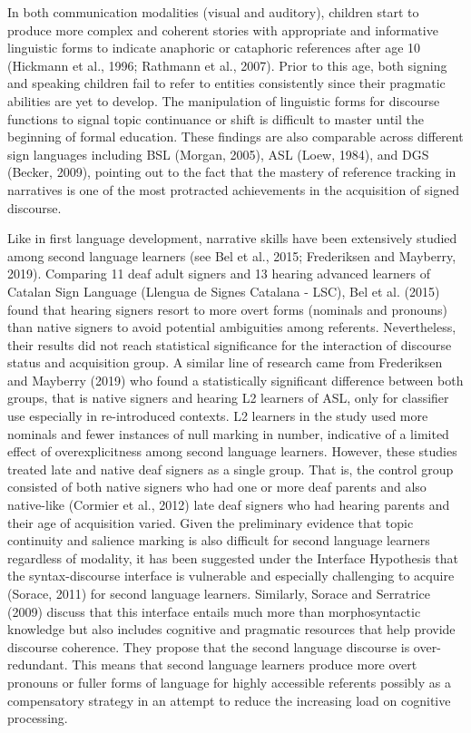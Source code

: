 \documentclass[]{elsarticle} %
\begin{document}
In both communication modalities (visual and auditory), children start
to produce more complex and coherent stories with appropriate and
informative linguistic forms to indicate anaphoric or cataphoric
references after age 10 (Hickmann et al., 1996; Rathmann et al., 2007).
Prior to this age, both signing and speaking children fail to refer to
entities consistently since their pragmatic abilities are yet to
develop. The manipulation of linguistic forms for discourse functions to
signal topic continuance or shift is difficult to master until the
beginning of formal education. These findings are also comparable across
different sign languages including BSL (Morgan, 2005), ASL (Loew, 1984),
and DGS (Becker, 2009), pointing out to the fact that the mastery of
reference tracking in narratives is one of the most protracted
achievements in the acquisition of signed discourse.

Like in first language development, narrative skills have been
extensively studied among second language learners (see Bel et al.,
2015; Frederiksen and Mayberry, 2019). Comparing 11 deaf adult signers
and 13 hearing advanced learners of Catalan Sign Language (Llengua de
Signes Catalana - LSC), Bel et al. (2015) found that hearing signers
resort to more overt forms (nominals and pronouns) than native signers
to avoid potential ambiguities among referents. Nevertheless, their
results did not reach statistical significance for the interaction of
discourse status and acquisition group. A similar line of research came
from Frederiksen and Mayberry (2019) who found a statistically
significant difference between both groups, that is native signers and
hearing L2 learners of ASL, only for classifier use especially in
re-introduced contexts. L2 learners in the study used more nominals and
fewer instances of null marking in number, indicative of a limited
effect of overexplicitness among second language learners. However,
these studies treated late and native deaf signers as a single group.
That is, the control group consisted of both native signers who had one
or more deaf parents and also native-like (Cormier et al., 2012) late
deaf signers who had hearing parents and their age of acquisition
varied. Given the preliminary evidence that topic continuity and
salience marking is also difficult for second language learners
regardless of modality, it has been suggested under the Interface
Hypothesis that the syntax-discourse interface is vulnerable and
especially challenging to acquire (Sorace, 2011) for second language
learners. Similarly, Sorace and Serratrice (2009) discuss that this
interface entails much more than morphosyntactic knowledge but also
includes cognitive and pragmatic resources that help provide discourse
coherence. They propose that the second language discourse is
over-redundant. This means that second language learners produce more
overt pronouns or fuller forms of language for highly accessible
referents possibly as a compensatory strategy in an attempt to reduce
the increasing load on cognitive processing.
\end{document}
